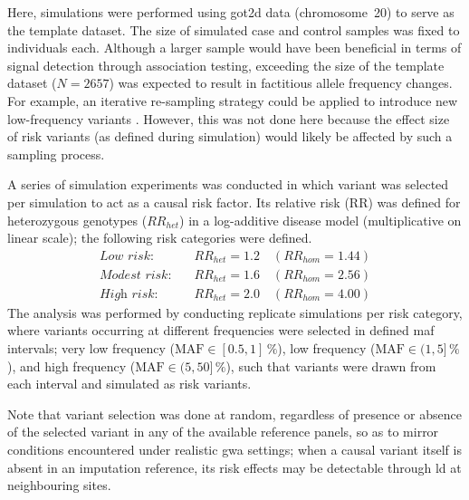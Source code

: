 Here, simulations were performed using \gls{got2d} data (chromosome~20) to serve as the template dataset.
The size of simulated case and control samples was fixed to  individuals each.
Although a larger sample would have been beneficial in terms of signal detection through association testing, exceeding the size of the template dataset (${N=\num{2657}}$) was expected to result in factitious allele frequency changes.
For example, an iterative re-sampling strategy could be applied to introduce new low-frequency variants \citep[\eg following][]{Moutsianas:2015jm}.
However, this was not done here because the effect size of risk variants (as defined during simulation) would likely be affected by such a sampling process.

A series of simulation experiments was conducted in which  variant was selected per simulation to act as a causal risk factor.
Its relative risk (RR) was defined for heterozygous genotypes ($RR_{het}$) in a log-additive disease model (\ie multiplicative on linear scale); the following  risk categories were defined.
\begin{align*}
	\textit{Low risk}     : & \quad {RR_{het}=1.2} \quad {(RR_{hom}=1.44)} \\
	\textit{Modest risk}  : & \quad {RR_{het}=1.6} \quad {(RR_{hom}=2.56)} \\
	\textit{High risk}    : & \quad {RR_{het}=2.0} \quad {(RR_{hom}=4.00)}
\end{align*}
The analysis was performed by conducting  replicate simulations per risk category, where variants occurring at different frequencies were selected in  defined \gls{maf} intervals;
very low frequency (${\text{MAF} \in [0.5, 1]\,\%}$), low frequency (${\text{MAF} \in (1, 5]\,\%}$), and high frequency (${\text{MAF} \in (5, 50]\,\%}$), such that  variants were drawn from each interval and simulated as risk variants.

Note that variant selection was done at random, regardless of presence or absence of the selected variant in any of the available reference panels, so as to mirror conditions encountered under realistic \gls{gwa} settings; \ie when a causal variant itself is absent in an imputation reference, its risk effects may be detectable through \gls{ld} at neighbouring sites.

%

%

